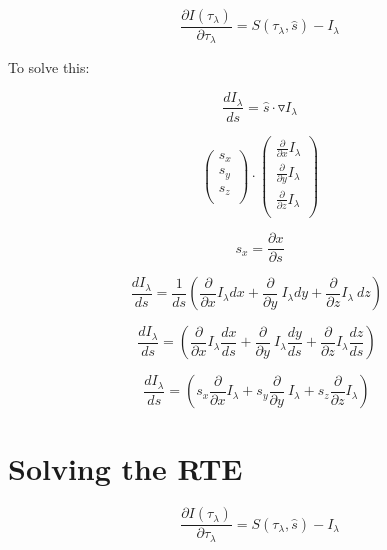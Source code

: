 \documentclass[12pt]{article}
\renewcommand{\_}{\kern-1.5pt\textunderscore\kern-1.5pt}
\begin{document}
\begin{itemize}
\vspace{\baselineskip}
 \[ \frac{ \partial I \left(  \tau_{ \lambda } \right) }{ \partial  \tau_{ \lambda }}=S \left(  \tau_{ \lambda },\hat{s} \right) -I_{ \lambda } \] \par

To solve this:\par

\par

\par

\par

 \[ \frac{dI_{ \lambda }}{ds}=\hat{s} \cdot \triangledown I_{ \lambda } \] \par

 \[  \left( \begin{array}{c}
	s_{x}\\
	s_{y}\\
	s_{z}\\
	\end{array} \right)  \cdot  \left( \begin{array}{c}
	\frac{ \partial }{ \partial x}I_{ \lambda }\\
	\frac{ \partial }{ \partial y}I_{ \lambda }\\
	\frac{ \partial }{ \partial z}I_{ \lambda }\\
	\end{array} \right)  \] \par

 \[ s_{x}=\frac{ \partial x}{ \partial s} \] \par

 \[ \frac{dI_{ \lambda }}{ds}=\frac{1}{ds} \left( \frac{ \partial }{ \partial x}I_{ \lambda } dx+\frac{ \partial }{ \partial y}~I_{ \lambda }dy+\frac{ \partial }{ \partial z}I_{ \lambda }~dz \right) ~~ \] \par

 \[ \frac{dI_{ \lambda }}{ds}= \left( \frac{ \partial }{ \partial x}I_{ \lambda }\frac{dx}{ds}+\frac{ \partial }{ \partial y}~I_{ \lambda }\frac{dy}{ds}+\frac{ \partial }{ \partial z}I_{ \lambda }\frac{dz}{ds} \right) ~~ \] \par

 \[ \frac{dI_{ \lambda }}{ds}= \left( s_{x}\frac{ \partial }{ \partial x}I_{ \lambda }+s_{y}\frac{ \partial }{ \partial y}~I_{ \lambda }+s_{z}\frac{ \partial }{ \partial z}I_{ \lambda } \right) ~~ \] \par


\vspace{\baselineskip}

\end{itemize}\section*{Solving the RTE}
 \[ \frac{ \partial I \left(  \tau_{ \lambda } \right) }{ \partial  \tau_{ \lambda }}=S \left(  \tau_{ \lambda },\hat{s} \right) -I_{ \lambda } \] \par
\end{document}
